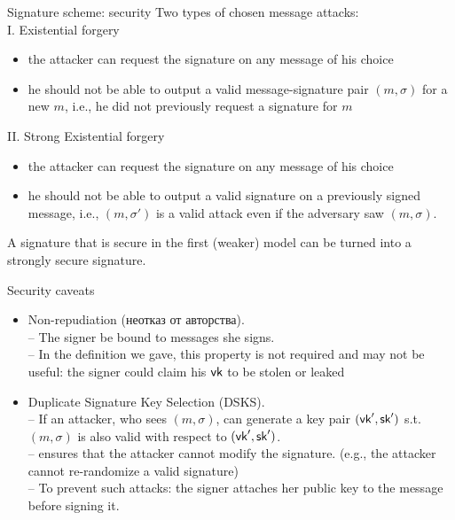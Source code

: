 \documentclass[usenames,dvipsnames, 9pt]{beamer}
\begin{document}
\begin{frame}{Signature scheme: security}
	\Large
	Two  types of {\color{Orange}chosen message attacks}: \\[10pt]
	{\color{Orange}I. Existential forgery} \\
	\large 
		\begin{itemize}
			\item the attacker can request the signature on any message of his choice
			\item  he should not be able to output a valid message-signature pair $(m, \sigma)$ for a new $m$, i.e.,  he did not previously request a signature for $m$
		\end{itemize}
	\Large 
	\pause
	{\color{Orange}II. Strong Existential forgery} \\
	\large 
	\begin{itemize}
		\item the attacker can request the signature on any message of his choice
		\item  he should not be able to output a valid signature on a {\color{Orange} previously signed message}, i.e., $(m, \sigma')$ is a valid attack even if the adversary saw $(m, \sigma)$.
	\end{itemize}

A signature that is secure in the first (weaker) model can be turned into a strongly secure signature.  
\end{frame}

\begin{frame}{Security caveats}
\Large
	\begin{itemize}
		\itemsep 15pt
		\item {\color{Orange}Non-repudiation} (неотказ от авторства). \\
		 -- The signer be bound to messages she signs. \\
		 -- In the definition we gave, this property is not required and may not be useful: the signer could claim his $\textsf{vk}$ to be stolen or leaked
		 \pause
		\item {\color{Orange} Duplicate Signature Key Selection (DSKS)}.\\
		-- If an attacker, who sees $(m, \sigma)$, can generate a key pair $(\textsf{vk}', \textsf{sk}')$ s.t.\ $(m, \sigma)$ is also valid with respect to $(\textsf{vk}', \textsf{sk}')$.\\
		-- ensures that the attacker cannot modify the signature. (e.g., the attacker cannot re-randomize a valid signature) \\
		-- To prevent such attacks: the signer attaches her public key to the message before signing it.
	\end{itemize}
\end{frame}
\end{document}
